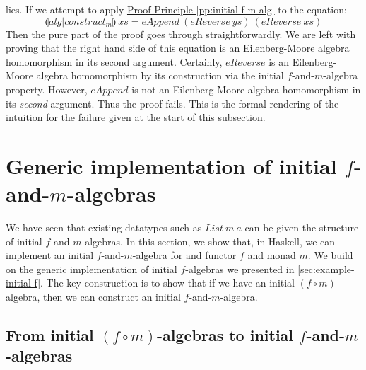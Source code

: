 \documentclass{jfp1}
\newcommand{\eFold}[2]{\llparenthesis #1|#2 \rrparenthesis}
\newcommand{\proofprinref}[1]{\hyperref[#1]{Proof Principle \ref*{#1}}}
\begin{document}
lies. If we attempt to apply \proofprinref{pp:initial-f-m-alg} to the
equation:
\begin{displaymath}
  \eFold{\mathit{alg}}{\mathit{construct}_m}~\mathit{xs} = \mathit{eAppend}~(\mathit{eReverse}~\mathit{ys})~(\mathit{eReverse}~\mathit{xs})
\end{displaymath}
Then the pure part of the proof goes through straightforwardly. We are
left with proving that the right hand side of this equation is an
Eilenberg-Moore algebra homomorphism in its second
argument. Certainly, $\mathit{eReverse}$ is an Eilenberg-Moore algebra
homomorphism by its construction via the initial $f$-and-$m$-algebra
property. However, $\mathit{eAppend}$ is not an Eilenberg-Moore
algebra homomorphism in its \emph{second} argument. Thus the proof
fails. This is the formal rendering of the intuition for the failure
given at the start of this subsection.


\section{Generic implementation of initial $f$-and-$m$-algebras}
\label{sec:impl-f-and-m}

We have seen that existing datatypes such as $\mathit{List}~m~a$ can
be given the structure of initial $f$-and-$m$-algebras. In this
section, we show that, in Haskell, we can implement an initial
$f$-and-$m$-algebra for and functor $f$ and monad $m$. We build on the
generic implementation of initial $f$-algebras we presented in
\autoref{sec:example-initial-f}. The key construction is to show that
if we have an initial $(f \circ m)$-algebra, then we can construct an
initial $f$-and-$m$-algebra.


\subsection{From initial $(f \circ m)$-algebras to initial $f$-and-$m$-algebras}
\end{document}
